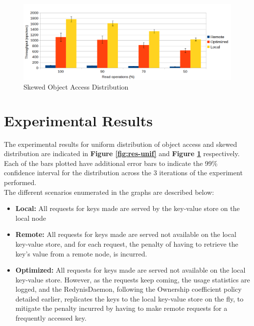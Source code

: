 \documentclass{sig-alternate}
\begin{document}
\begin{figure}[ht]
\centering
\includegraphics[width=\textwidth]{images/Uniform-dist-throughput.png}
\caption{Skewed Object Access Distribution}
\label{fig:res-skew}
\end{figure}


\section{Experimental Results}

The experimental results for uniform distribution of object access and skewed distribution are indicated in \textbf{Figure \ref{fig:res-unif}} and \textbf{Figure \ref{fig:res-skew}} respectively.\\

Each of the bars plotted have additional error bars to indicate the 99\% confidence interval for the distribution across the 3 iterations of the experiment performed. \\

The different scenarios enumerated in the graphs are described below:
\begin{itemize}
	\item \textbf{Local:} All requests for keys made are served by the key-value store on the local node
	\item \textbf{Remote:} All requests for keys made are served not available on the local key-value store, and for each request, the penalty of having to retrieve the key's value from a remote node, is incurred.
	\item \textbf{Optimized:} All requests for keys made are served not available on the local key-value store. However, as the requests keep coming, the usage statistics are logged, and the RedynisDaemon, following the Ownership coefficient policy detailed earlier, replicates the keys to the local key-value store on the fly, to mitigate the penalty incurred by having to make remote requests for a frequently accessed key.
\end{itemize}
\end{document}
